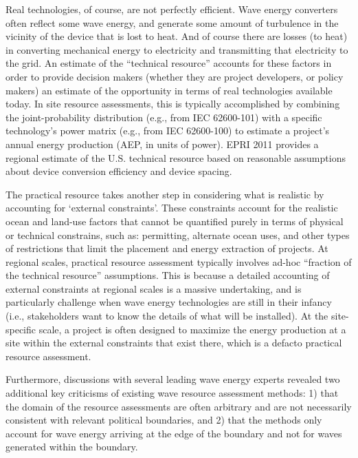 Real technologies, of course, are not perfectly efficient. Wave energy converters often reflect some wave energy, and generate some amount of turbulence in the vicinity of the device that is lost to heat. And of course there are losses (to heat) in converting mechanical energy to electricity and transmitting that electricity to the grid. An estimate of the ``technical resource'' accounts for these factors in order to provide decision makers (whether they are project developers, or policy makers) an estimate of the opportunity in terms of real technologies available today. In site resource assessments, this is typically accomplished by combining the joint-probability distribution (e.g., from IEC 62600-101) with a specific technology's power matrix (e.g., from IEC 62600-100) to estimate a project's annual energy production (AEP, in units of power).
EPRI 2011 provides a regional estimate of the U.S. technical resource based on reasonable assumptions about device conversion efficiency and device spacing.

The practical resource takes another step in considering what is realistic by accounting for `external constraints'. These constraints account for the realistic ocean and land-use factors that cannot be quantified purely in terms of physical or technical constrains, such as: permitting, alternate ocean uses, and other types of restrictions that limit the placement and energy extraction of projects. At regional scales, practical resource assessment typically involves ad-hoc ``fraction of the technical resource'' assumptions. This is because a detailed accounting of external constraints at regional scales is a massive undertaking, and is particularly challenge when wave energy technologies are still in their infancy (i.e., stakeholders want to know the details of what will be installed). At the site-specific scale, a project is often designed to maximize the energy production at a site within the external constraints that exist there, which is a defacto practical resource assessment.



Furthermore, discussions with several leading wave energy experts revealed two additional key criticisms of existing wave resource assessment methods: 1) that the domain of the resource assessments are often arbitrary and are not necessarily consistent with relevant political boundaries, and 2) that the methods only account for wave energy arriving at the edge of the boundary and not for waves generated within the boundary.

